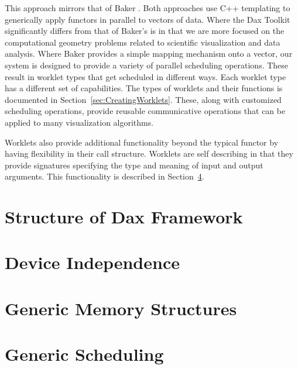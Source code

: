 This approach mirrors that of Baker \etal{}.  Both
approaches use C++ templating to generically apply functors in parallel to
vectors of data.  Where the Dax Toolkit significantly differs from that of
Baker's is in that we are more focused on the computational geometry
problems related to scientific visualization and data analysis. Where Baker
provides a simple mapping mechanism onto a vector, our system is designed
to provide a variety of parallel scheduling operations.  These result in
worklet types that get scheduled in different ways.  Each worklet type has
a different set of capabilities. The types of worklets and their functions
is documented in Section~\ref{sec:CreatingWorklets}. These, along with
customized scheduling operations, provide reusable communicative operations
that can be applied to many visualization algorithms.

Worklets also provide additional functionality beyond the typical functor
by having flexibility in their call structure. Worklets are self describing
in that they provide signatures  specifying the type and
meaning of input and output arguments. This functionality is described in
Section~\ref{sec:GenericScheduling}.


\section{Structure of Dax Framework}
\label{sec:StructureOfDaxFramework}



\section{Device Independence}
\label{sec:DeviceIndependence}




\section{Generic Memory Structures}
\label{sec:GenericMemoryStructures}



\section{Generic Scheduling}
\label{sec:GenericScheduling}


